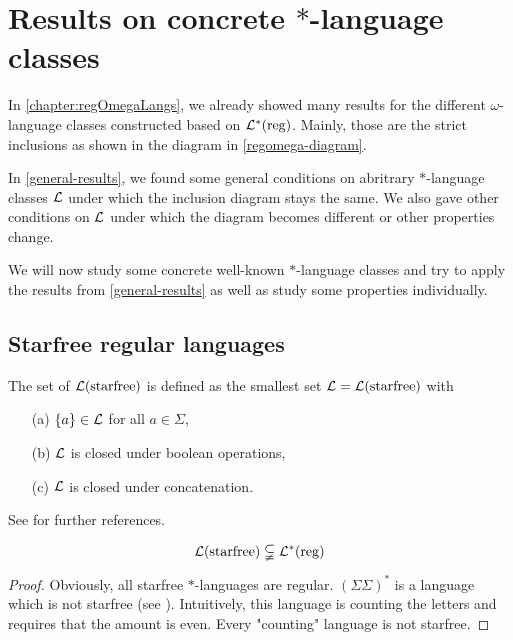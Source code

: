 \section{Results on concrete $*$-language classes}
\label{concrete-results}

In \cref{chapter:regOmegaLangs}, we already showed many results for the different $\omega$-language classes constructed based on $\mathcal{L}^*(\textup{\textrm{reg}})$. Mainly, those are the strict inclusions as shown in the diagram in \cref{regomega-diagram}.

In \cref{general-results}, we found some general conditions on abritrary $*$-language classes $\mathcal{L}$ under which the inclusion diagram stays the same. We also gave other conditions on $\mathcal{L}$ under which the diagram becomes different or other properties change.

We will now study some concrete well-known $*$-language classes and try to apply the results from \cref{general-results} as well as study some properties individually.



\subsection{Starfree regular languages}
\label{lang:starfree}
The set of  $\mathcal{L}(\textup{\textrm{starfree}})$ is defined as the smallest set $\mathcal{L} = \mathcal{L}(\textup{\textrm{starfree}})$ with
\begin{itemize}
\item[(a)] $\Set{a} \in \Lang$ for all $a \in \Sigma$,
\item[(b)] $\mathcal{L}$ is closed under boolean operations,
\item[(c)] $\mathcal{L}$ is closed under concatenation.
\end{itemize}
See \cite[Section 2.2]{ConcHierR104} for further references.

\begin{lemma}
\[ \mathcal{L}(\textup{\textrm{starfree}}) \subsetneqq \mathcal{L}^*(\textup{\textrm{reg}}) \]
\begin{proof}
Obviously, all starfree $*$-languages are regular. $(\Sigma\Sigma)^*$ is a language which is not starfree (see \cite[IV.2.1]{FinAutLogR109}). Intuitively, this language is counting the letters and requires that the amount is even. Every "counting" language is not starfree.
\end{proof}
\end{lemma}

